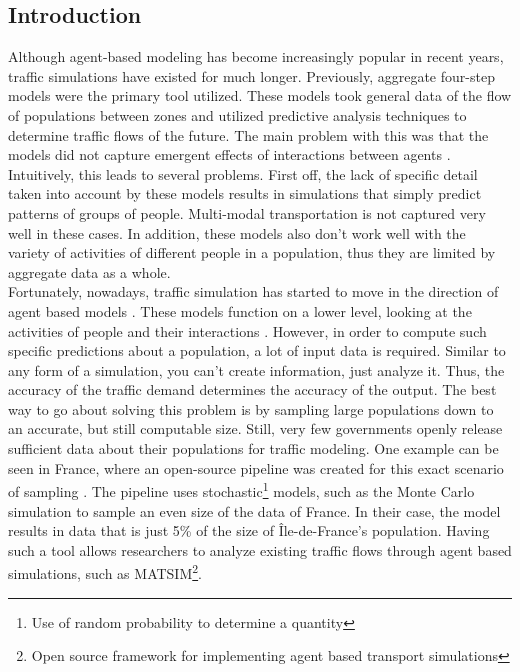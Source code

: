 \documentclass[11pt]{article}
\begin{document}
\begin{multicols}{2}
    \section{Introduction}
    \quad Although agent-based modeling has become increasingly popular in recent years, traffic simulations have existed for much longer. Previously, aggregate four-step models were the primary tool utilized. These models took general data of the flow of populations between zones and utilized predictive analysis techniques to determine traffic flows of the future. The main problem with this was that the models did not capture emergent effects of interactions between agents \cite{types-of-modeling}. Intuitively, this leads to several problems. First off, the lack of specific detail taken into account by these models results in simulations that simply predict patterns of groups of people. Multi-modal transportation is not captured very well in these cases. In addition, these models also don't work well with the variety of activities of different people in a population, thus they are limited by aggregate data as a whole. \\

    \quad Fortunately, nowadays, traffic simulation has started to move in the direction of agent based models \cite{ile-de-france}. These models function on a lower level, looking at the activities of people and their interactions \cite{agent-based-model}. However, in order to compute such specific predictions about a population, a lot of input data is required. Similar to any form of a simulation, you can't create information, just analyze it. Thus, the accuracy of the traffic demand determines the accuracy of the output. The best way to go about solving this problem is by sampling large populations down to an accurate, but still computable size. Still, very few governments openly release sufficient data about their populations for traffic modeling. One example can be seen in France, where an open-source pipeline was created for this exact scenario of sampling \cite{ile-de-france}. The pipeline uses stochastic\footnote{Use of random probability to determine a quantity} models, such as the Monte Carlo simulation to sample an even size of the data of France. In their case, the model results in data that is just 5\% of the size of Île-de-France's population. Having such a tool allows researchers to analyze existing traffic flows through agent based simulations, such as MATSIM\footnote{Open source framework for implementing agent based transport simulations}\cite{matsim}.\\


\end{multicols}
\end{document}
